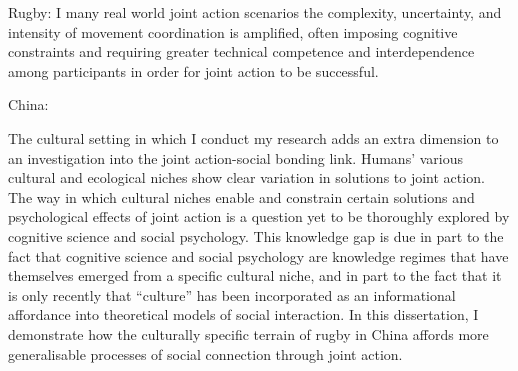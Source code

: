 \begin{CJK}{UTF8}{gbsn}
    Rugby:
    I many real world joint action scenarios the complexity, uncertainty, and intensity of movement coordination is amplified, often imposing cognitive constraints and requiring greater technical competence and interdependence among participants in order for joint action to be successful.



    China:

    The cultural setting in which I conduct my research adds an extra dimension to an investigation into the joint action-social bonding link. Humans' various cultural and ecological niches show clear variation in solutions to joint action.  The way in which cultural niches enable and constrain certain solutions and psychological effects of joint action is a question yet to be thoroughly explored by cognitive science and social psychology.  This knowledge gap is due in part to the fact that cognitive science and social psychology are knowledge regimes that have themselves emerged from a specific cultural niche, and in part to the fact that it is only recently that ``culture'' has been incorporated as an informational affordance into theoretical models of social interaction. In this dissertation, I demonstrate how the culturally specific terrain of rugby in China affords more generalisable processes of social connection through joint action.



\end{CJK}
